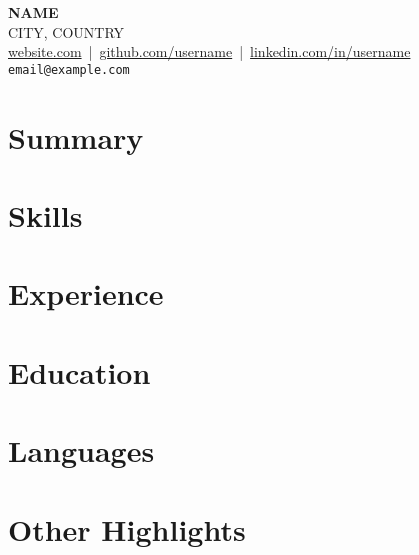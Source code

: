\documentclass[a4paper,10pt]{article}
\begin{document}
\begin{center}
    {\LARGE \textbf{NAME}}\\[2mm]
    CITY, COUNTRY \\[1mm]
    \href{}{website.com} \,|\, 
    \href{}{github.com/username} \,|\, 
    \href{}{linkedin.com/in/username}\\[2mm]
    \texttt{email@example.com}
\end{center}

\vspace{0.3cm}

\section*{Summary}

\section*{Skills}

\section*{Experience}

\section*{Education}

\section*{Languages}

\section*{Other Highlights}
\end{document}
